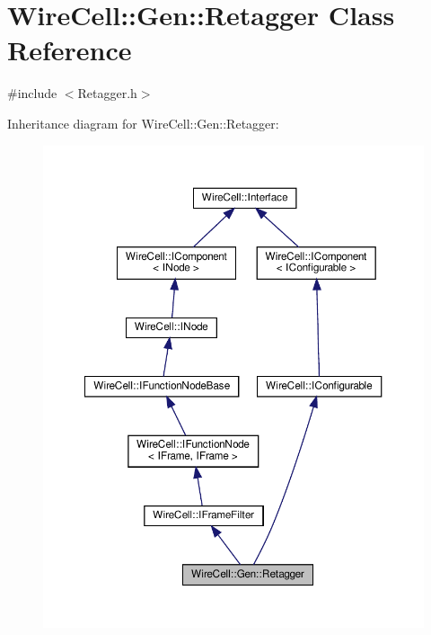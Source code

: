 \hypertarget{class_wire_cell_1_1_gen_1_1_retagger}{}\section{Wire\+Cell\+:\+:Gen\+:\+:Retagger Class Reference}
\label{class_wire_cell_1_1_gen_1_1_retagger}


{\ttfamily \#include $<$Retagger.\+h$>$}



Inheritance diagram for Wire\+Cell\+:\+:Gen\+:\+:Retagger\+:
\nopagebreak
\begin{figure}[H]
\begin{center}
\leavevmode
\includegraphics[width=350pt]{class_wire_cell_1_1_gen_1_1_retagger__inherit__graph}
\end{center}
\end{figure}


